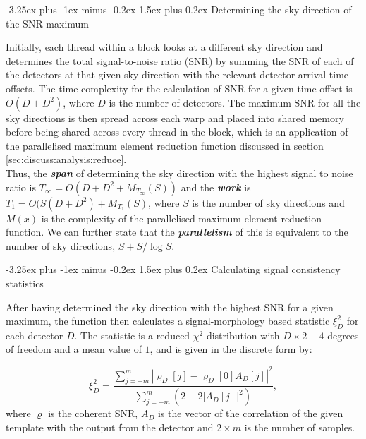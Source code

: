 \documentclass{article}
\makeatletter
\renewcommand{\paragraph}{\@startsection{paragraph}{4}{0ex}%
    {-3.25ex plus -1ex minus -0.2ex}%
    {1.5ex plus 0.2ex}%
    {\normalfont\normalsize\bfseries}}
\makeatother
\begin{document}
\paragraph{Determining the sky direction of the SNR maximum} \label{sec:discuss:analysis:skydir}

Initially, each thread within a block looks at a different sky direction and determines the total signal-to-noise ratio (SNR) by summing the SNR of each of the detectors at that given sky direction with the relevant detector arrival time offsets.
The time complexity for the calculation of SNR for a given time offset is \(O(D + D^2)\), where \(D\) is the number of detectors.
The maximum SNR for all the sky directions is then spread across each warp and placed into shared memory before being shared across every thread in the block, which is an application of the parallelised maximum element reduction function discussed in section \ref{sec:discuss:analysis:reduce}.
\\

Thus, the \textit{\textbf{span}} of determining the sky direction with the highest signal to noise ratio is \(T_\infty = O(D + D^2 + M_{T_\infty}(S))\) and the \textit{\textbf{work}} is \(T_1 = O(S(D + D^2) + M_{T_1}(S)\), where \(S\) is the number of sky directions and \(M(x)\) is the complexity of the parallelised maximum element reduction function.
We can further state that the \textit{\textbf{parallelism}} of this is equivalent to the number of sky directions, \(S + S/\log S\).

\paragraph{Calculating signal consistency statistics} \label{sec:discuss:analysis:stat}

After having determined the sky direction with the highest SNR for a given maximum, the function then calculates a signal-morphology based statistic \(\xi_D^2\) for each detector \(D\).
The statistic is a reduced \(\chi^2\) distribution with \(D\times2 - 4\) degrees of freedom and a mean value of \(1\), and is given in the discrete form by:

\begin{equation} \label{eq:statistic}
    \xi_D^2 = \frac{\sum_{j = -m}^{m} | \varrho_D[j] - \varrho_D[0] A_D[j]|^2}{\sum_{j = -m}^{m} (2 - 2|A_D[j]|^2)},
\end{equation}
where \(\varrho\) is the coherent SNR, \(A_D\) is the vector of the correlation of the given template with the output from the detector and \(2\times{m}\) is the number of samples.
\end{document}
